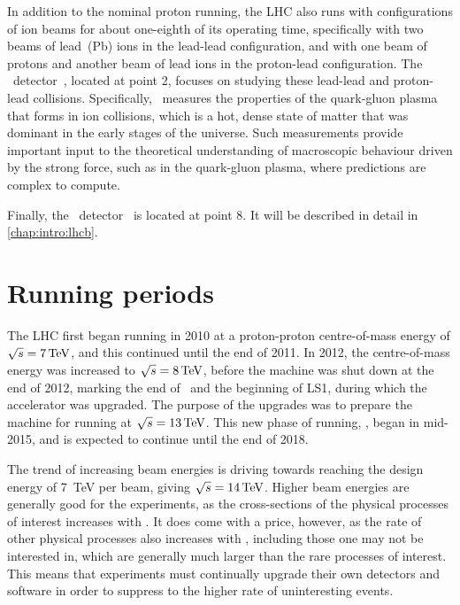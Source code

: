 In addition to the nominal proton running, the \ac{LHC} also runs with 
configurations of ion beams for about one-eighth of its operating time, 
specifically with two beams of lead~(Pb) ions in the lead-lead configuration, 
and with one beam of protons and another beam of lead ions in the proton-lead 
configuration.
The \alice\ detector~\cite{Aamodt:2008zz}, located at point 2, focuses on 
studying these lead-lead and proton-lead collisions.
Specifically, \alice\ measures the properties of the quark-gluon plasma that 
forms in ion collisions, which is a hot, dense state of matter that was 
dominant in the early stages of the universe.
Such measurements provide important input to the theoretical understanding of 
macroscopic behaviour driven by the strong force, such as in the quark-gluon 
plasma, where predictions are complex to compute.

Finally, the \lhcb\ detector~\cite{Alves:2008zz} is located at point 8.
It will be described in detail in \cref{chap:intro:lhcb}.

\section{Running periods}

The \ac{LHC} first began running in 2010 at a proton-proton centre-of-mass 
energy of $\sqrts = \SI{7}{\TeV}$, and this continued until the end of 2011.
In 2012, the centre-of-mass energy was increased to $\sqrts = \SI{8}{\TeV}$, 
before the machine was shut down at the end of 2012, marking the end of 
\runone\ and the beginning of \ac{LS1}, during which the accelerator was 
upgraded.
The purpose of the upgrades was to prepare the machine for running at $\sqrts = 
\SI{13}{\TeV}$.
This new phase of running, \runtwo, began in mid-2015, and is expected to 
continue until the end of 2018.

The trend of increasing beam energies is driving towards reaching the design 
energy of \SI{7}{\TeV} per beam, giving $\sqrts = \SI{14}{\TeV}$.
Higher beam energies are generally good for the experiments, as the 
cross-sections of the physical processes of interest increases with \sqrts.
It does come with a price, however, as the rate of other physical processes 
also increases with \sqrts, including those one may not be interested in, which 
are generally much larger than the rare processes of interest.
This means that experiments must continually upgrade their own detectors and 
software in order to suppress to the higher rate of uninteresting events.
